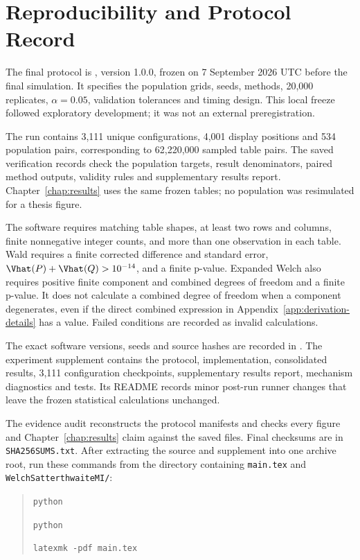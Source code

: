\chapter{Reproducibility and Protocol Record}
\label{app:reproducibility}

The final protocol is
,
version 1.0.0, frozen on 7 September 2026 UTC before the final simulation.
It specifies the population grids, seeds, methods, 20,000 replicates,
\(\alpha=0.05\), validation tolerances and timing design. This local freeze
followed exploratory development; it was not an external preregistration.

The run contains 3,111 unique configurations, 4,001 display positions and
534 population pairs, corresponding to 62,220,000 sampled table pairs.
The saved verification records check the population targets, result
denominators, paired method outputs, validity rules and supplementary
results report.
Chapter~\ref{chap:results} uses the same frozen tables; no population was
resimulated for a thesis figure.

The software requires matching table shapes, at least two rows and columns,
finite nonnegative integer counts, and more than one observation in each
table. Wald requires a finite corrected difference and standard error,
\(\Vhat(P)+\Vhat(Q)>10^{-14}\), and a finite p-value. Expanded Welch also
requires positive finite component and combined degrees of freedom and a
finite p-value. It does not calculate a combined degree of freedom when a
component degenerates, even if the direct combined expression in
Appendix~\ref{app:derivation-details} has a value. Failed conditions are
recorded as invalid calculations.

The exact software versions, seeds and source hashes are recorded in
.
The experiment supplement contains the protocol, implementation, consolidated
results, 3,111 configuration checkpoints, supplementary results report,
mechanism diagnostics and tests. Its README records minor post-run runner
changes that leave the frozen statistical calculations unchanged.

The evidence audit reconstructs the protocol manifests and checks every figure
and Chapter~\ref{chap:results} claim against the saved files. Final checksums
are in \texttt{SHA256SUMS.txt}. After extracting the source and supplement into
one archive root, run these commands from the directory containing
\texttt{main.tex} and \texttt{WelchSatterthwaiteMI/}:
\begin{quote}
\small\raggedright
\texttt{python} \par
\texttt{python} \par
\texttt{latexmk -pdf main.tex}
\end{quote}
